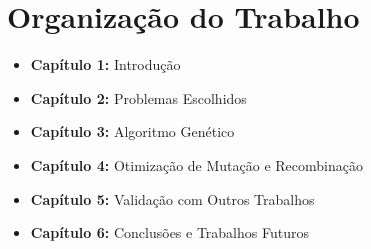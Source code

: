 \section{Organização do Trabalho}

\begin{itemize}
	\item \textbf{Capítulo 1:} Introdução
	\item \textbf{Capítulo 2:} Problemas Escolhidos
	\item \textbf{Capítulo 3:} Algoritmo Genético
	\item \textbf{Capítulo 4:} Otimização de Mutação e Recombinação
	\item \textbf{Capítulo 5:} Validação com Outros Trabalhos
	\item \textbf{Capítulo 6:} Conclusões e Trabalhos Futuros
\end{itemize}
